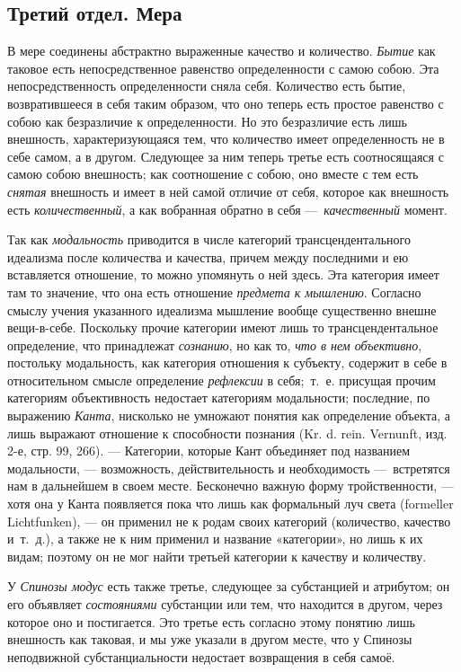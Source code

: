 \subsection{Третий отдел. Мера}
В мере соединены абстрактно выраженные качество
и количество. {\em Бытие} как таковое есть
непосредственное равенство определенности с самою собою. Эта
непосредственность определенности сняла себя. Количество есть бытие,
возвратившееся в себя таким образом, что оно теперь есть простое равенство
с собою как безразличие к определенности. Но это безразличие есть лишь
внешность, характеризующаяся тем, что количество имеет определенность не в
себе самом, а в другом. Следующее за ним теперь третье есть соотносящаяся с
самою собою внешность; как соотношение с собою, оно вместе с тем есть
{\em снятая} внешность и имеет в ней самой отличие от
себя, которое как внешность есть {\em количественный},
а как вобранная обратно в себя —~{\em качественный}
момент.

Так как {\em модальность} приводится в числе категорий
трансцендентального идеализма после количества и качества, причем между
последними и ею вставляется отношение, то можно упомянуть о ней здесь. Эта
категория имеет там то значение, что она есть отношение
{\em предмета к мышлению}. Согласно смыслу учения
указанного идеализма мышление вообще существенно внешне вещи-в-себе.
Поскольку прочие категории имеют лишь то трансцендентальное определение,
что принадлежат {\em сознанию}, но как то,
{\em что в нем объективно}, постольку модальность, как
категория отношения к субъекту, содержит в себе в относительном смысле
определение {\em рефлексии} в себя;~т.~е. присущая
прочим категориям объективность недостает категориям модальности;
последние, по выражению {\em Канта}, нисколько не
умножают понятия как определение объекта, а лишь выражают отношение к
способности познания (Kr. d. rein. Vernunft, изд. 2-е, стр. 99, 266). —
Категории, которые Кант объединяет под названием модальности, —
возможность, действительность и необходимость —~встретятся нам в дальнейшем
в своем месте. Бесконечно важную форму тройственности, — хотя она у Канта
появляется пока что лишь как формальный луч света (formeller Lichtfunken),
— он применил не к родам своих категорий (количество, качество и~т.~д.), а
также не к ним применил и название «категории», но лишь к их видам; поэтому
он не мог найти третьей категории к качеству и количеству.

У {\em Спинозы модус} есть
также третье, следующее за субстанцией и атрибутом; он его объявляет
{\em состояниями} субстанции или тем, что находится в
другом, через которое оно и постигается. Это третье есть согласно этому
понятию лишь внешность как таковая, и мы уже указали в другом месте, что у
Спинозы неподвижной субстанциальности недостает возвращения в себя самоё.

